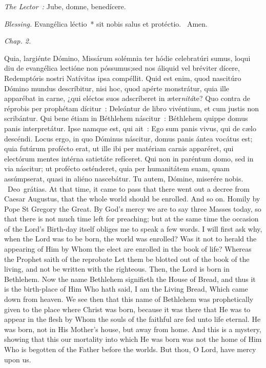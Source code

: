 {{    \emph{The Lector~:} Jube, domne, benedícere.

    \emph{Blessing.} Evangélica léctio~* sit nobis salus et protéctio. \Rbar{}~Amen.
  }

  \bigskip{}
  {


  }

  {
    \hspace{10ex}{Lesson VII.}\hfill\emph{Chap. 2.}\hspace{10ex}

    \begin{parcolumns}[rulebetween,colwidths={1=.45\linewidth}]{2}
    {Quia, largiénte Dómino, Missárum solémnia ter hódie celebratúri sumus, loqui diu de evangélica lectióne non póssumus;}{sed nos áliquid vel bréviter dícere, Redemptóris nostri Natívitas ipsa compéllit. Quid est enim, quod nascitúro Dómino mundus descríbitur, nisi hoc, quod apérte monstrátur, quia ille apparébat in carne, ¿qui eléctos suos adscríberet in æter\emph{nitá}te? Quo contra de réprobis per prophétam dícitur~: Deleántur de libro vivéntium, et cum justis non scribántur. Qui bene étiam in Béthlehem náscitur~: Béthlehem quippe domus panis interpretátur. Ipse namque est, qui ait~: Ego sum panis vivus, qui de cælo descéndi. Locus ergo, in quo Dóminus náscitur, domus panis ántea vocátus est; quia futúrum profécto erat, ut ille ibi per matériam carnis apparéret, qui electórum mentes intérna satietáte refíceret. Qui non in paréntum domo, sed in via náscitur; ut profécto osténderet, quia per humanitátem suam, quam assúmpserat, quasi in aliéno nascebátur.
      Tu autem, Dómine, miserére nobis.
      \Rbar{}~Deo~grátias.}
    {At that time, it came to pass that there went out a decree from Caesar Augustus, that the whole world should be enrolled. And so on.}
    {Homily by Pope St Gregory the Great.}
    {By God's mercy we are to say three Masses today, so that there is not much time left for preaching; but at the same time the occasion of the Lord's Birth-day itself obliges me to speak a few words. I will first ask why, when the Lord was to be born, the world was enrolled? Was it not to herald the appearing of Him by Whom the elect are enrolled in the book of life? Whereas the Prophet saith of the reprobate Let them be blotted out of the book of the living, and not be written with the righteous. Then, the Lord is born in Bethlehem. Now the name Bethlehem signifieth the House of Bread, and thus it is the birth-place of Him Who hath said, I am the Living Bread, Which came down from heaven. We see then that this name of Bethlehem was prophetically given to the place where Christ was born, because it was there that He was to appear in the flesh by Whom the souls of the faithful are fed unto life eternal. He was born, not in His Mother's house, but away from home. And this is a mystery, showing that this our mortality into which He was born was not the home of Him Who is begotten of the Father before the worlds.
      But thou, O Lord, have mercy upon us.}
    \end{parcolumns}

}}
